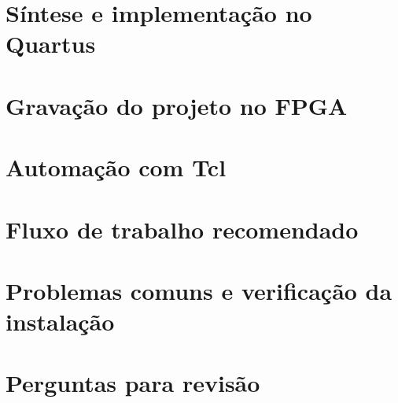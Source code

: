 \section{Síntese e implementação no Quartus}

\section{Gravação do projeto no FPGA}

\section{Automação com Tcl}

\section{Fluxo de trabalho recomendado}

\section{Problemas comuns e verificação da instalação}

\section{Perguntas para revisão}
